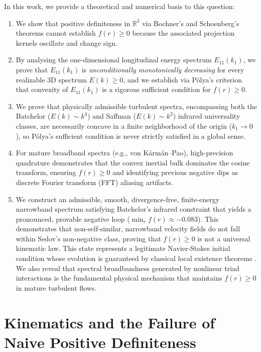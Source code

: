 \documentclass[lineno]{jfm}
\begin{document}
In this work, we provide a theoretical and numerical basis to this question:
\begin{enumerate}
\item We show that positive definiteness in $\mathbb{R}^3$ via Bochner's and Schoenberg's theorems \citep{Bochner1959, Schoenberg1938} cannot establish $f(r) \ge 0$ because the associated projection kernels oscillate and change sign.
\item By analysing the one-dimensional longitudinal energy spectrum $E_{11}(k_1)$, we prove that $E_{11}(k_1)$ is \emph{unconditionally monotonically decreasing} for every realizable 3D spectrum $E(k) \ge 0$, and we establish via P\'olya's criterion \citep{Polya1949} that convexity of $E_{11}(k_1)$ is a rigorous sufficient condition for $f(r) \ge 0$.
\item We prove that physically admissible turbulent spectra, encompassing both the Batchelor ($E(k) \sim k^4$) and Saffman ($E(k) \sim k^2$) infrared universality classes, are necessarily concave in a finite neighborhood of the origin ($k_1 \to 0$), so P\'olya's sufficient condition is never strictly satisfied in a global sense.
\item For mature broadband spectra (e.g., von K\'arm\'an--Pao), high-precision quadrature demonstrates that the convex inertial bulk dominates the cosine transform, ensuring $f(r) \ge 0$ and identifying previous negative dips as discrete Fourier transform (FFT) aliasing artifacts.
\item We construct an admissible, smooth, divergence-free, finite-energy narrowband spectrum satisfying Batchelor's infrared constraint that yields a pronounced, provable negative loop ($\min_r f(r) \approx -0.083$). This demonstrates that non-self-similar, narrowband velocity fields do not fall within Sedov's non-negative class, proving that $f(r) \ge 0$ is not a universal kinematic law. This state represents a legitimate Navier-Stokes initial condition whose evolution is guaranteed by classical local existence theorems \citep{Leray1934, FujitaKato1964}. We also reveal that spectral broadbandness generated by nonlinear triad interactions is the fundamental physical mechanism that maintains $f(r) \ge 0$ in mature turbulent flows.
\end{enumerate}

\section{Kinematics and the Failure of Naive Positive Definiteness}
\label{sec:bochner_failure}
\end{document}
